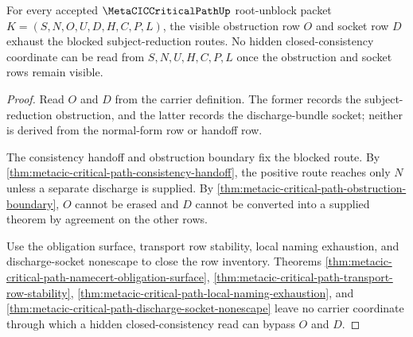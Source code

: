 \begin{theorem}
\label{thm:metacic-critical-path-obstruction-ledger-exhaustion}
For every accepted $\MetaCICCriticalPathUp$ root-unblock packet $K=(S,N,O,U,D,H,C,P,L)$, the visible obstruction row $O$ and socket row $D$ exhaust the blocked subject-reduction routes. No hidden closed-consistency coordinate can be read from $S,N,U,H,C,P,L$ once the obstruction and socket rows remain visible.
\end{theorem}
\begin{proof}
Read $O$ and $D$ from the carrier definition. The former records the subject-reduction obstruction, and the latter records the discharge-bundle socket; neither is derived from the normal-form row or handoff row.

The consistency handoff and obstruction boundary fix the blocked route. By \autoref{thm:metacic-critical-path-consistency-handoff}, the positive route reaches only $N$ unless a separate discharge is supplied. By \autoref{thm:metacic-critical-path-obstruction-boundary}, $O$ cannot be erased and $D$ cannot be converted into a supplied theorem by agreement on the other rows.

Use the obligation surface, transport row stability, local naming exhaustion, and discharge-socket nonescape to close the row inventory. Theorems \autoref{thm:metacic-critical-path-namecert-obligation-surface}, \autoref{thm:metacic-critical-path-transport-row-stability}, \autoref{thm:metacic-critical-path-local-naming-exhaustion}, and \autoref{thm:metacic-critical-path-discharge-socket-nonescape} leave no carrier coordinate through which a hidden closed-consistency read can bypass $O$ and $D$.
\end{proof}

